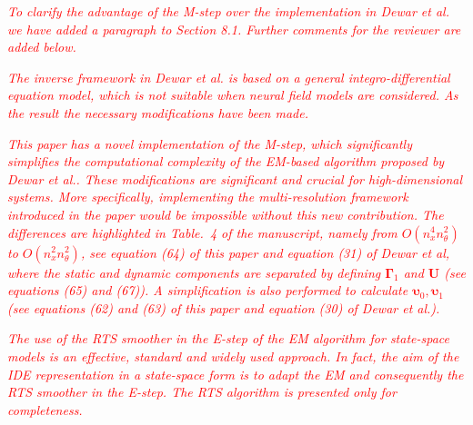 \documentclass{article}
\newcommand{\dean}[1]{\textcolor{red}{#1}}
\begin{document}
\begin{enumerate}
		\emph{\dean{To clarify the advantage of the M-step over the implementation in Dewar et al. we have added a paragraph to Section 8.1. Further comments for the reviewer are added below.}}
		
\emph{\dean{The inverse framework in Dewar et al. is based on a general integro-differential equation model, which is not suitable when neural field models are considered. As the result the necessary modifications have been made. }}
		
\emph{\dean{This paper has a novel implementation of the M-step, which significantly simplifies the computational complexity of the EM-based algorithm proposed by Dewar et al.. These modifications are significant and crucial for high-dimensional systems. More specifically, implementing the multi-resolution framework introduced in the paper would be impossible without this new contribution. The differences are highlighted in Table.~4 of the manuscript, namely from $O(n_x^4n_{\theta}^2)$ to $O(n_x^2n_{\theta}^2)$, see equation (64) of this paper and equation (31) of Dewar et al, where the static and dynamic components are separated by defining $\boldsymbol \Gamma_1$ and $\mathbf U$ (see equations (65) and (67)). A simplification is also performed to calculate $\boldsymbol\upsilon_0, \boldsymbol\upsilon_1$ (see equations (62) and (63) of this paper and equation (30) of Dewar et al.).} }
		
\emph{\dean{The use of the RTS smoother in the E-step of the EM algorithm for state-space models is an effective, standard and widely used approach. In fact, the aim of the IDE representation in a state-space form is to adapt the EM and consequently the RTS smoother in the E-step. The RTS algorithm is presented only for completeness.} }
		

\end{enumerate}
\end{document}
